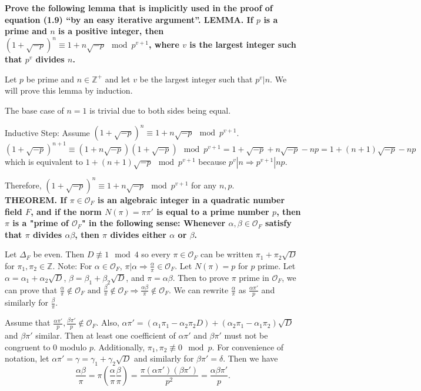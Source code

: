 \documentclass[letterpaper, 12pt]{article}
\begin{document}
\textbf{Prove the following lemma that is implicitly used in the proof of equation (1.9) “by an easy iterative argument”.
LEMMA.  If $p$ is a prime and $n$ is a positive integer, then $(1+\sqrt{-p})^n \equiv 1 + n\sqrt{-p} \mod{p^{v+1}}$, where $v$ is the largest integer such that $p^v$ divides $n$.}
    
    Let $p$ be prime and $n\in\mathbb{Z}^+$ and let $v$ be the largest integer such that $p^v | n$. We will prove this lemma by induction.
    
    The base case of $n=1$ is trivial due to both sides being equal.
    
    Inductive Step: Assume $(1+\sqrt{-p})^n \equiv 1 + n\sqrt{-p} \mod{p^{v+1}}$.
    $$(1+\sqrt{-p})^{n+1} \equiv (1+n\sqrt{-p})(1+\sqrt{-p}) \mod{p^{v+1}} = 1 + \sqrt{-p} + n\sqrt{-p} - np = 1 + (n+1)\sqrt{-p} - np$$
    which is equivalent to $1 + (n+1)\sqrt{-p} \mod{p^{v+1}}$ because $p^v | n \Rightarrow p^{v+1} | np$.
    
    Therefore, $(1+\sqrt{-p})^n \equiv 1 + n\sqrt{-p} \mod{p^{v+1}}$ for any $n,p$.\\
    
\textbf{THEOREM.  If $\pi\in\mathcal{O}_F$ is an algebraic integer in a quadratic number field $F$, and if the norm $N(\pi)=\pi\pi'$ is equal to a prime number $p$, then $\pi$ is a "prime of $\mathcal{O}_F$" in the following sense:
Whenever $\alpha,\beta\in\mathcal{O}_F$ satisfy that $\pi$ divides $\alpha\beta$, then $\pi$ divides either $\alpha$ or $\beta$.}

    Let $\Delta_F$ be even. Then $D\not\equiv 1 \mod{4}$ so every $\pi\in\mathcal{O}_F$ can be written $\pi_1+\pi_2\sqrt{D}$ for $\pi_1,\pi_2\in\mathbb{Z}$. Note: For $\alpha\in\mathcal{O}_F$, $\pi|\alpha\Rightarrow\frac{\alpha}{\pi}\in\mathcal{O}_F$. Let $N(\pi)=p$ for $p$ prime. Let $\alpha=\alpha_1+\alpha_2\sqrt{D}$, $\beta=\beta_1+\beta_2\sqrt{D}$, and $\pi=\alpha\beta$. Then to prove $\pi$ prime in $\mathcal{O}_F$, we can prove that $\frac{\alpha}{\pi}\not\in\mathcal{O}_F \text{ and }\frac{\beta}{\pi}\not\in\mathcal{O}_F \Rightarrow \frac{\alpha\beta}{\pi}\not\in\mathcal{O}_F$. We can rewrite $\frac{\alpha}{\pi}$ as $\frac{\alpha\pi'}{p}$ and similarly for $\frac{\beta}{\pi}$. 
    
    Assume that $\frac{\alpha\pi'}{p},\frac{\beta\pi'}{p}\not\in\mathcal{O}_F$. Also, $\alpha\pi'=(\alpha_1\pi_1-\alpha_2\pi_2D)+(\alpha_2\pi_1-\alpha_1\pi_2)\sqrt{D}$ and $\beta\pi'$ similar. Then at least one coefficient of $\alpha\pi'$ and $\beta\pi'$ must not be congruent to $0$ modulo $p$. Additionally, $\pi_1,\pi_2\not\equiv 0\mod{p}$. For convenience of notation, let $\alpha\pi'=\gamma=\gamma_1+\gamma_2\sqrt{D}$ and similarly for $\beta\pi'=\delta$. Then we have $$\frac{\alpha\beta}{\pi}=\pi\left(\frac{\alpha}{\pi}\frac{\beta}{\pi}\right) = \frac{\pi(\alpha\pi')(\beta\pi')}{p^2}=\frac{\alpha\beta\pi'}{p}.$$
    
\end{document}

